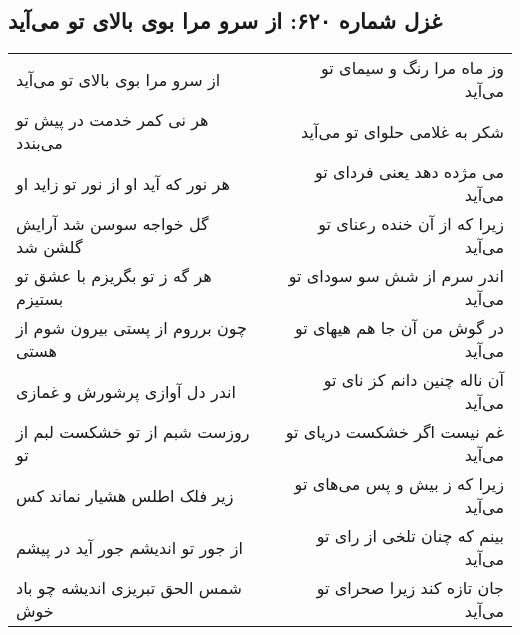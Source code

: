 \begin{center}
\section*{غزل شماره ۶۲۰: از سرو مرا بوی بالای تو می‌آید}
\label{sec:0620}
\begin{longtable}{l p{0.5cm} r}
از سرو مرا بوی بالای تو می‌آید
&&
وز ماه مرا رنگ و سیمای تو می‌آید
\\
هر نی کمر خدمت در پیش تو می‌بندد
&&
شکر به غلامی حلوای تو می‌آید
\\
هر نور که آید او از نور تو زاید او
&&
می مژده دهد یعنی فردای تو می‌آید
\\
گل خواجه سوسن شد آرایش گلشن شد
&&
زیرا که از آن خنده رعنای تو می‌آید
\\
هر گه ز تو بگریزم با عشق تو بستیزم
&&
اندر سرم از شش سو سودای تو می‌آید
\\
چون برروم از پستی بیرون شوم از هستی
&&
در گوش من آن جا هم هیهای تو می‌آید
\\
اندر دل آوازی پرشورش و غمازی
&&
آن ناله چنین دانم کز نای تو می‌آید
\\
روزست شبم از تو خشکست لبم از تو
&&
غم نیست اگر خشکست دریای تو می‌آید
\\
زیر فلک اطلس هشیار نماند کس
&&
زیرا که ز بیش و پس می‌های تو می‌آید
\\
از جور تو اندیشم جور آید در پیشم
&&
بینم که چنان تلخی از رای تو می‌آید
\\
شمس الحق تبریزی اندیشه چو باد خوش
&&
جان تازه کند زیرا صحرای تو می‌آید
\\
\end{longtable}
\end{center}

